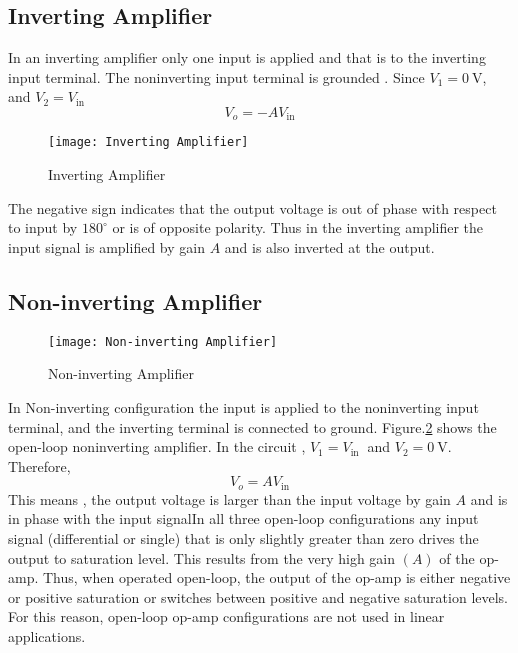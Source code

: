    \subsection{Inverting Amplifier}
   In an inverting amplifier only one input is applied and that is to the inverting input terminal. The noninverting input terminal is grounded . Since $V_{1}=0 \mathrm{~V}$, and $V_{2}=V_{\text {in }}$
   \begin{equation}
   V_{o}=-A V_{\mathrm{in}}
   \end{equation} 
   \begin{figure}[H]
   	\centering
   	\texttt{[image: Inverting Amplifier]}
   	\caption{Inverting Amplifier}
   	\label{Inverting Amplifier}
   \end{figure}
   $\left. \right. $\\
   The negative sign indicates that the output voltage is out of phase with respect to input by $180^{\circ}$ or is of opposite polarity. Thus in the inverting amplifier the input signal is amplified by gain $A$ and is also inverted at the output.
   \subsection{Non-inverting Amplifier}
   \begin{figure}[H]
   	\centering
   	\texttt{[image: Non-inverting Amplifier]}
   	\caption{Non-inverting Amplifier}
   	\label{Non-inverting Amplifier}
   \end{figure}
   In Non-inverting configuration the input is applied to the noninverting input terminal, and the inverting terminal is connected to ground. Figure.\ref{Non-inverting Amplifier}  shows the open-loop noninverting amplifier. 
   In the circuit , $ V_{1}=V_{\text {in }}$ and $V_{2}=0 \mathrm{~V}$.
   Therefore,
   \begin{equation}
   V_{o}=A V_{\mathrm{in}}
   \end{equation}
   This means , the output voltage is larger than the input voltage by gain $A$ and is in phase with the input signalIn all three open-loop configurations any input signal (differential or single) that is only slightly greater than zero drives the output to saturation level. This results from the very high gain $(A)$ of the op-amp. Thus, when operated open-loop, the output of the op-amp is either negative or positive saturation or switches between positive and negative saturation levels. For this reason, open-loop op-amp configurations are not used in linear applications.
